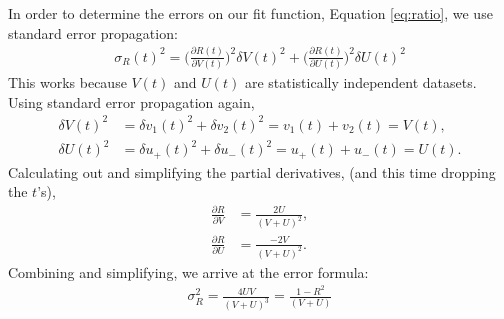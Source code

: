  In order to determine the errors on our fit function, Equation \ref{eq:ratio}, we use standard error propagation:
 	\begin{align}
 		\sigma_{R}(t)^{2} = \Big(\frac{\partial R(t)}{\partial V(t)}\Big)^{2} \delta V(t)^{2} + \Big(\frac{\partial R(t)}{\partial U(t)}\Big)^{2} \delta U(t)^{2}
	\end{align}
This works because $V(t)$ and $U(t)$ are statistically independent datasets. Using standard error propagation again, 
	\begin{equation}	
	\begin{aligned}
  		\delta V(t)^{2} &= \delta v_{1}(t)^{2} + \delta v_{2}(t)^{2} = v_{1}(t) + v_{2}(t) = V(t), \\ 
  		\delta U(t)^{2} &= \delta u_{+}(t)^{2} + \delta u_{-}(t)^{2} = u_{+}(t) + u_{-}(t) = U(t).
	\end{aligned}
	\end{equation}
Calculating out and simplifying the partial derivatives, (and this time dropping the $t$'s),
	\begin{equation}	
	\begin{aligned}
  		\frac{\partial R}{\partial V} &= \frac{2U}{(V + U)^{2}}, \\ 
  		\frac{\partial R}{\partial U} &= \frac{-2V}{(V + U)^{2}}.
	\end{aligned}
	\end{equation}
Combining and simplifying, we arrive at the error formula:
 	\begin{align}
 		\sigma_{R}^{2} = \frac{4UV}{(V + U)^{3}} = \frac{1-R^{2}}{(V + U)} 
	\end{align}




